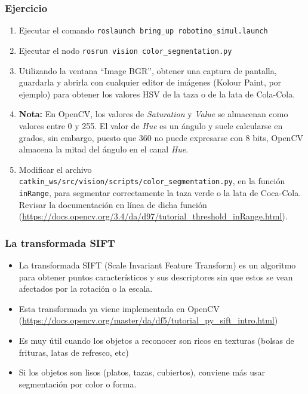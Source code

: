 \documentclass[10pt,spanish,aspectratio=1610]{beamer}
\begin{document}
\begin{frame}\frametitle{Ejercicio}
  \begin{enumerate}
  \item Ejecutar el comando \texttt{roslaunch bring\_up robotino\_simul.launch}
  \item Ejecutar el nodo \texttt{rosrun vision color\_segmentation.py}
  \item Utilizando la ventana ``Image BGR'', obtener una captura de pantalla, guardarla y abrirla con cualquier editor de imágenes (Kolour Paint, por ejemplo) para obtener los valores HSV de la taza o de la lata de Cola-Cola.
    \item \textbf{Nota:} En OpenCV, los valores de \textit{Saturation} y \textit{Value} se almacenan como valores entre 0 y 255. El valor de \textit{Hue} es un ángulo y suele calcularse en grados, sin embargo, puesto que 360 no puede expresarse con 8 bits, OpenCV almacena la mitad del ángulo en el canal \textit{Hue}. 
  \item Modificar el archivo \texttt{catkin\_ws/src/vision/scripts/color\_segmentation.py}, en la función \texttt{inRange}, para segmentar correctamente la taza verde o la lata de Coca-Cola. Revisar la documentación en línea de dicha función (\url{https://docs.opencv.org/3.4/da/d97/tutorial_threshold_inRange.html}). 
  \end{enumerate}
\end{frame}

\begin{frame}\frametitle{La transformada SIFT}
  \begin{itemize}
  \item La transformada SIFT (Scale Invariant Feature Transform) es un algoritmo para obtener puntos característicos y sus descriptores sin que estos se vean afectados por la rotación o la escala.
  \item Esta transformada ya viene implementada en OpenCV (\url{https://docs.opencv.org/master/da/df5/tutorial_py_sift_intro.html})
  \item Es muy útil cuando los objetos a reconocer son ricos en texturas (bolsas de frituras, latas de refresco, etc)
  \item Si los objetos son lisos (platos, tazas, cubiertos), conviene más usar segmentación por color o forma.
  \end{itemize}
\end{frame}
\end{document}
